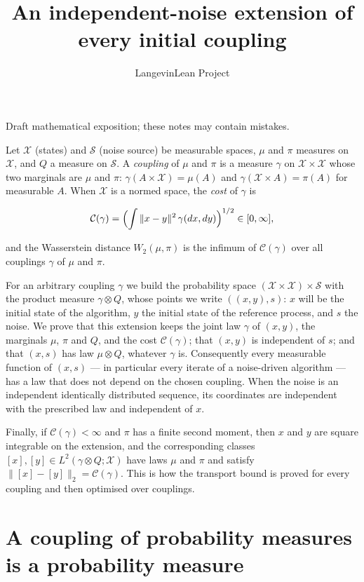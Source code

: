 \documentclass[11pt,a4paper]{article}
\title{\texorpdfstring{An independent-noise extension of every initial coupling}{An independent-noise extension of every initial coupling}}
\author{LangevinLean Project}
\date{}
\begin{document}
\maketitle
Draft mathematical exposition; these notes may contain mistakes.


Let \(\mathcal X\) (states) and \(\mathcal S\) (noise source) be measurable spaces, \(\mu\) and \(\pi\) measures on \(\mathcal X\), and \(Q\) a measure on \(\mathcal S\). A \emph{coupling} of \(\mu\) and \(\pi\) is a measure \(\gamma\) on \(\mathcal X\times\mathcal X\) whose two marginals are \(\mu\) and \(\pi\): \(\gamma(A\times\mathcal X)=\mu(A)\) and \(\gamma(\mathcal X\times A)=\pi(A)\) for measurable \(A\). When \(\mathcal X\) is a normed space, the \emph{cost} of \(\gamma\) is


\[\mathcal C(\gamma)=\Bigl(\int\|x-y\|^2\,\gamma(dx,dy)\Bigr)^{1/2}\in[0,\infty],\]


and the Wasserstein distance \(W_2(\mu,\pi)\) is the infimum of \(\mathcal C(\gamma)\) over all couplings \(\gamma\) of \(\mu\) and \(\pi\).




For an arbitrary coupling \(\gamma\) we build the probability space \((\mathcal X\times\mathcal X)\times\mathcal S\) with the product measure \(\gamma\otimes Q\), whose points we write \(((x,y),s)\): \(x\) will be the initial state of the algorithm, \(y\) the initial state of the reference process, and \(s\) the noise. We prove that this extension keeps the joint law \(\gamma\) of \((x,y)\), the marginals \(\mu\), \(\pi\) and \(Q\), and the cost \(\mathcal C(\gamma)\); that \((x,y)\) is independent of \(s\); and that \((x,s)\) has law \(\mu\otimes Q\), whatever \(\gamma\) is. Consequently every measurable function of \((x,s)\) — in particular every iterate of a noise-driven algorithm — has a law that does not depend on the chosen coupling. When the noise is an independent identically distributed sequence, its coordinates are independent with the prescribed law and independent of \(x\).




Finally, if \(\mathcal C(\gamma)<\infty\) and \(\pi\) has a finite second moment, then \(x\) and \(y\) are square integrable on the extension, and the corresponding classes \([x],[y]\in L^2(\gamma\otimes Q;\mathcal X)\) have laws \(\mu\) and \(\pi\) and satisfy \(\|[x]-[y]\|_2=\mathcal C(\gamma)\). This is how the transport bound is proved for every coupling and then optimised over couplings.


\section{\texorpdfstring{A coupling of probability measures is a probability measure}{A coupling of probability measures is a probability measure}}
\end{document}

